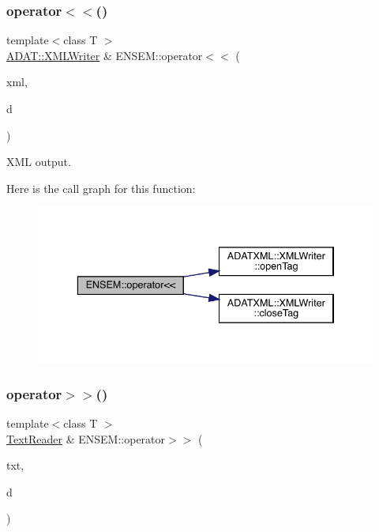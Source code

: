 \subsubsection{\texorpdfstring{operator$<$$<$()}{operator<<()}\hspace{0.1cm}{\footnotesize\ttfamily [2/2]}}
{\footnotesize\ttfamily template$<$class T $>$ \\
\mbox{\hyperlink{classADATXML_1_1XMLWriter}{A\+D\+A\+T\+::\+X\+M\+L\+Writer}} \& E\+N\+S\+E\+M\+::operator$<$$<$ (\begin{DoxyParamCaption}\item[{\mbox{\hyperlink{classADATXML_1_1XMLWriter}{A\+D\+A\+T\+::\+X\+M\+L\+Writer}} \&}]{xml,  }\item[{const \mbox{\hyperlink{classENSEM_1_1OMatrix}{O\+Matrix}}$<$ T $>$ \&}]{d }\end{DoxyParamCaption})\hspace{0.3cm}{\ttfamily [inline]}}



X\+ML output. 

Here is the call graph for this function\+:\nopagebreak
\begin{figure}[H]
\begin{center}
\leavevmode
\includegraphics[width=336pt]{d8/d55/group__obsmatrix_ga62a405af58665d9bce46afb03abd8c90_cgraph}
\end{center}
\end{figure}
\mbox{\label{group__obsmatrix_ga2c0b293dbb7aeff91ccffc12fdb0e858}} 
\subsubsection{\texorpdfstring{operator$>$$>$()}{operator>>()}}
{\footnotesize\ttfamily template$<$class T $>$ \\
\mbox{\hyperlink{classENSEM_1_1TextReader}{Text\+Reader}} \& E\+N\+S\+E\+M\+::operator$>$$>$ (\begin{DoxyParamCaption}\item[{\mbox{\hyperlink{classENSEM_1_1TextReader}{Text\+Reader}} \&}]{txt,  }\item[{\mbox{\hyperlink{classENSEM_1_1OMatrix}{O\+Matrix}}$<$ T $>$ \&}]{d }\end{DoxyParamCaption})\hspace{0.3cm}{\ttfamily [inline]}}



